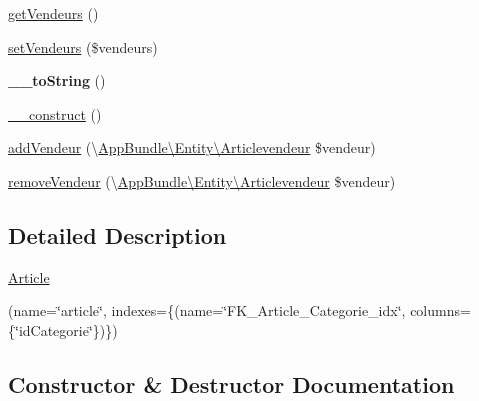 \begin{DoxyCompactItemize}
\item 
\hyperlink{class_app_bundle_1_1_entity_1_1_article_aa0ce076bf9123f1705dc401dd4894585}{get\+Vendeurs} ()
\item 
\hyperlink{class_app_bundle_1_1_entity_1_1_article_a1252b99a36208743907df415fe555c36}{set\+Vendeurs} (\$vendeurs)
\item 
\mbox{\label{class_app_bundle_1_1_entity_1_1_article_ad6391bf9f06fa3a7b64745665cbe0468}} 
{\bfseries \+\_\+\+\_\+to\+String} ()
\item 
\hyperlink{class_app_bundle_1_1_entity_1_1_article_a1f8bc3caf8f89010c2e2b62ce1cee6c8}{\+\_\+\+\_\+construct} ()
\item 
\hyperlink{class_app_bundle_1_1_entity_1_1_article_a4522b9cb97a5dc19c3d179debf56dcf7}{add\+Vendeur} (\textbackslash{}\hyperlink{class_app_bundle_1_1_entity_1_1_articlevendeur}{App\+Bundle\textbackslash{}\+Entity\textbackslash{}\+Articlevendeur} \$vendeur)
\item 
\hyperlink{class_app_bundle_1_1_entity_1_1_article_a952b84a67d1ae9695569e4d59a6e1bc1}{remove\+Vendeur} (\textbackslash{}\hyperlink{class_app_bundle_1_1_entity_1_1_articlevendeur}{App\+Bundle\textbackslash{}\+Entity\textbackslash{}\+Articlevendeur} \$vendeur)
\end{DoxyCompactItemize}


\subsection{Detailed Description}
\hyperlink{class_app_bundle_1_1_entity_1_1_article}{Article}

(name=\char`\"{}article\char`\"{}, indexes=\{(name=\char`\"{}\+F\+K\+\_\+\+Article\+\_\+\+Categorie\+\_\+idx\char`\"{}, columns=\{\char`\"{}id\+Categorie\char`\"{}\})\})   

\subsection{Constructor \& Destructor Documentation}
\mbox{\label{class_app_bundle_1_1_entity_1_1_article_a1f8bc3caf8f89010c2e2b62ce1cee6c8}} 
